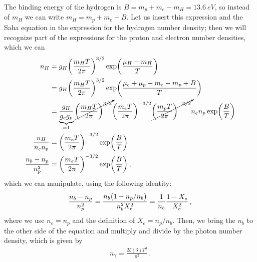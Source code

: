 \documentclass[main.tex]{subfiles}
\begin{document}
%
%
The binding energy of the hydrogen is \(B=m_p+m_e-m_H=\SI{13.6}{eV}\), so instead of \(m_H\) we can write \(m_H = m_p+m_e-B\).
Let us insert this expression and the Saha equation in the expression for the hydrogen number density; then we will recognize part of the expressions for the proton and electron number densities, which we can 
%
\begin{subequations}
\begin{align}
  n_H &=  g_H \qty(\frac{m_H T}{2 \pi })^{3/2} \exp(\frac{\mu _H - m_H}{T})  \\
  &= g_H \qty(\frac{m_H T}{2 \pi })^{3/2} \exp(\frac{\mu_e + \mu _p - m_e - m_p + B}{T}) \\
  &= \underbrace{\frac{g_H}{g_e g_p}}_{= 1} \cancelto{}{\qty(\frac{m_H T}{2 \pi })^{3/2}}
  \qty(\frac{m_e T}{2 \pi })^{-3/2}
  \cancelto{}{\qty(\frac{m_p T}{2 \pi })^{-3/2}}
  n_e n_p
  \exp(\frac{B}{T}) \\
  \frac{n_H}{n_e n_p} &=  \qty(\frac{m_e T}{2 \pi })^{-3/2} \exp(\frac{B}{T})  \\
  \frac{n_b - n_p}{n_p^2} &= \qty(\frac{m_e T}{2 \pi })^{-3/2} \exp(\frac{B}{T}) 
\,,
\end{align}
\end{subequations}
%
which we can manipulate, using the following identity: 
%
\begin{align}
  \frac{n_b - n_p}{n_p^2} = \frac{n_b \qty(1 - n_p/ n_b)}{n_b^2 X_e^2} = \frac{1}{n_b} \frac{1 - X_e}{X_e^2}
\,,
\end{align}
%
where we use \(n_e = n_p\) and the definition of \(X_e = n_p / n_b\). Then, we bring the \(n_b\) to the other side of the equation and multiply and divide by the photon number density, which is given by
%
\begin{align} \label{eq:n-gamma}
  n_{\gamma } = \frac{2 \zeta (3) T^3}{\pi^2}
\,.
\end{align}
\end{document}
